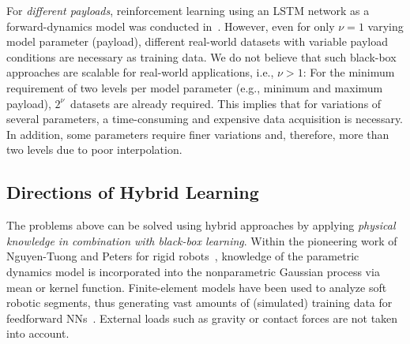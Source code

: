 For \textit{different payloads}, reinforcement learning using an LSTM network as a forward-dynamics model was conducted in~\cite{Centurelli.2022}.
However, even for only $\nu{=}1$ varying model parameter (payload), different real-world datasets with variable payload conditions are necessary as training data.
We do not believe that such black-box approaches are scalable for real-world applications, i.e., $\nu{>}1$: 
For the minimum requirement of two levels per model parameter (e.g., minimum and maximum payload), $2^{\nu}$~datasets are already required.
This implies that for variations of several parameters, a time-consuming and expensive data acquisition is necessary.
In addition, some parameters require finer variations and, therefore, more than two levels due to poor interpolation.  
 \subsection{Directions of Hybrid Learning}
The problems above can be solved using hybrid approaches by applying \textit{physical knowledge in combination with black-box learning}. 
Within the pioneering work of Nguyen-Tuong and Peters for rigid robots~\cite{NguyenTuong.2010}, knowledge of the parametric dynamics model is incorporated into the nonparametric Gaussian process via mean or kernel function. 
Finite-element models have been used to analyze soft robotic segments, thus generating vast amounts of (simulated) training data for feedforward NNs~\cite{Runge.2017}. 
External loads such as gravity or contact forces are not taken into account. 

